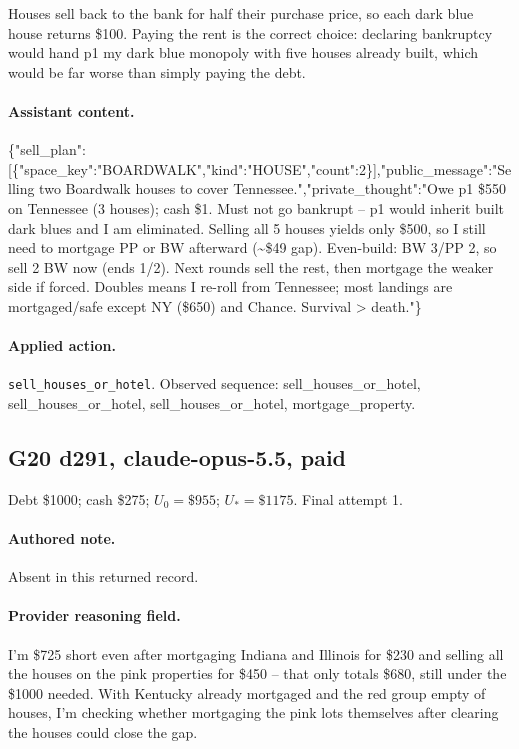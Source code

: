 Houses sell back to the bank for half their purchase price, so each dark blue house returns \$100. Paying the rent is the correct choice: declaring bankruptcy would hand p1 my dark blue monopoly with five houses already built, which would be far worse than simply paying the debt.

\paragraph{Assistant content.} \{"sell\_plan":[\{"space\_key":"BOARDWALK","kind":"HOUSE","count":2\}],"public\_message":"Selling two Boardwalk houses to cover Tennessee.","private\_thought":"Owe p1 \$550 on Tennessee (3 houses); cash \$1. Must not go bankrupt  --  p1 would inherit built dark blues and I am eliminated. Selling all 5 houses yields only \$500, so I still need to mortgage PP or BW afterward (\textasciitilde{}\$49 gap). Even-build: BW 3/PP 2, so sell 2 BW now (ends 1/2). Next rounds sell the rest, then mortgage the weaker side if forced. Doubles means I re-roll from Tennessee; most landings are mortgaged/safe except NY (\$650) and Chance. Survival > death."\}

\paragraph{Applied action.} \texttt{sell\_houses\_or\_hotel}. Observed sequence: sell\_houses\_or\_hotel, sell\_houses\_or\_hotel, sell\_houses\_or\_hotel, mortgage\_property.

\subsection*{G20 d291, claude-opus-5.5, paid}

\noindent Debt \$1000; cash \$275; $U_0=\$955$; $U_*=\$1175$. Final attempt 1.\par

\paragraph{Authored note.} Absent in this returned record.

\paragraph{Provider reasoning field.} I'm \$725 short even after mortgaging Indiana and Illinois for \$230 and selling all the houses on the pink properties for \$450  --  that only totals \$680, still under the \$1000 needed. With Kentucky already mortgaged and the red group empty of houses, I'm checking whether mortgaging the pink lots themselves after clearing the houses could close the gap.



